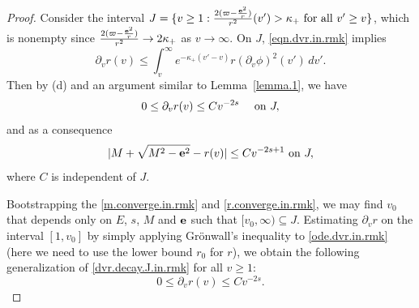 \documentclass[10pt, reqno]{amsart}
\theoremstyle{definition}
\theoremstyle{remark}
\numberwithin{equation}{section}
\newcommand{\abs}[1]{\vert#1\vert}
\newcommand{\set}[1]{\{#1\}}
\newcommand{\ud}{d}
\newcommand{\rd}{\partial}
\newcommand{\0}{\emptyset}
\newcommand{\kpp}{\kappa}
\newcommand{\bfe}{{\bf e}}
\newcommand{\f}{\frac}
\newcommand{\e}{\bfe}							%
\begin{document}
\begin{proof}
Consider the interval $J = \set{v \geq 1 : \f{2(\varpi-\f{{\bf e}^2}{r})}{r^2} (v') > \kpp_{+} \hbox{ for all } v' \geq v}$, which is nonempty since $\f{2(\varpi-\f{{\bf e}^2}{r})}{r^2} \to 2 \kpp_{+}$ as $v \to \infty$. On $J$, \eqref{eqn.dvr.in.rmk} implies
\begin{equation*}
	\rd_{v} r(v)
	\leq \int_{v}^{\infty} e^{-\kpp_{+}(v' - v)} r (\rd_{v} \phi)^{2}(v') \, \ud v'.
\end{equation*}
Then by (d) and an argument similar to Lemma~\ref{lemma.1}, we have
\begin{equation} \label{dvr.decay.J.in.rmk}
	0 \leq \rd_{v} r(v) \leq C v^{-2s} \quad \hbox{ on } J,
\end{equation}
and as a consequence
\begin{equation} \label{r.converge.in.rmk}
\abs{M + \sqrt{M^{2} - \e^{2}} - r(v)} \leq C v^{-2s +1} \hbox{ on } J,
\end{equation}
where $C$ is independent of $J$.

Bootstrapping the \eqref{m.converge.in.rmk} and \eqref{r.converge.in.rmk}, we may find $v_{0}$ that depends only on $E$, $s$, $M$ and $\e$ such that $[v_{0}, \infty) \subseteq J$. Estimating $\rd_{v} r$ on the interval $[1, v_{0}]$ by simply applying Gr\"onwall's inequality to \eqref{ode.dvr.in.rmk} (here we need to use the lower bound $r_{0}$ for $r$), we obtain the following generalization of \eqref{dvr.decay.J.in.rmk} for all $v \geq 1$:
\begin{equation} \label{dvr.decay.in.rmk}
	0 \leq \rd_{v} r(v) \leq C v^{-2s}.
\end{equation}



\end{proof}
\end{document}
